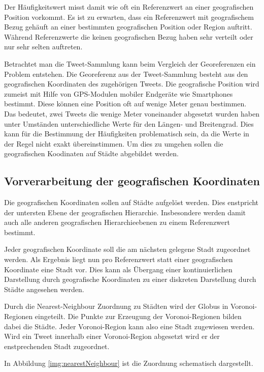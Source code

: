 			Der Häufigkeitswert misst damit wie oft ein Referenzwert an einer geografischen Position vorkommt.
			Es ist zu erwarten, dass ein Referenzwert mit geografischem Bezug gehäuft an einer bestimmten geografischen Position oder Region auftritt.
			Während Referenzwerte die keinen geografischen Bezug haben sehr verteilt oder nur sehr selten auftreten. 

			Betrachtet man die Tweet-Sammlung kann beim Vergleich der Georeferenzen ein Problem entstehen.
			Die Georeferenz aus der Tweet-Sammlung besteht aus den geografischen Koordinaten des zugehörigen Tweets.
			Die geografische Position wird zumeist mit Hilfe von GPS-Modulen mobiler Endgeräte wie Smartphones bestimmt. 
			Diese können eine Position oft auf wenige Meter genau bestimmen.
			Das bedeutet, zwei Tweets die wenige Meter voneinander abgesetzt wurden haben unter Umständen unterschiedliche Werte für den Längen- und Breitengrad.
			Dies kann für die Bestimmung der Häufigkeiten problematisch sein, da die Werte in der Regel nicht exakt übereinstimmen.
			Um dies zu umgehen sollen die geografischen Koodinaten auf Städte abgebildet werden.

		\subsection{Vorverarbeitung der geografischen Koordinaten}

			Die geografischen Koordinaten sollen auf Städte aufgelöst werden.
			Dies enstpricht der untersten Ebene der geografischen Hierarchie.
			Insbesondere werden damit auch alle anderen geografischen Hierarchieebenen zu einem Referenzwert bestimmt.

			Jeder geografischen Koordinate soll die am nächsten gelegene Stadt zugeordnet werden.
			Als Ergebnis liegt nun pro Referenzwert statt einer geografischen Koordinate eine Stadt vor.
			Dies kann als Übergang einer kontinuierlichen Darstellung durch geografische Koordinaten zu einer diskreten Darstellung durch Städte angesehen werden. 
			
			Durch die Nearest-Neighbour Zuordnung zu Städten wird der Globus in Voronoi-Regionen eingeteilt.
			Die Punkte zur Erzeugung der Voronoi-Regionen bilden dabei die Städte. 
			Jeder Voronoi-Region kann also eine Stadt zugewiesen werden.
			Wird ein Tweet innerhalb einer Voronoi-Region abgesetzt wird er der enstprechenden Stadt zugeordnet.

			In Abbildung \ref{img:nearestNeighbour} ist die Zuordnung schematisch dargestellt.

